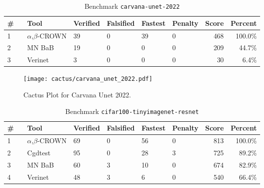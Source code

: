 

\begin{table}[h]
\begin{center}
\caption{Benchmark \texttt{carvana-unet-2022}} \label{tab:cat_{cat}}
{\setlength{\tabcolsep}{2pt}
\begin{tabular}[h]{@{}llllllrr@{}}
\toprule
\textbf{\# ~} & \textbf{Tool} & \textbf{Verified} & \textbf{Falsified} & \textbf{Fastest} & \textbf{Penalty} & \textbf{Score} & \textbf{Percent}\\
\midrule
1 & $\alpha$,$\beta$-CROWN & 39 & 0 & 39 & 0 & 468 & 100.0\% \\
2 & MN BaB & 19 & 0 & 0 & 0 & 209 & 44.7\% \\
3 & Verinet & 3 & 0 & 0 & 0 & 30 & 6.4\% \\
\bottomrule
\end{tabular}
}
\end{center}
\end{table}



\begin{figure}[h]
\centerline{\texttt{[image: cactus/carvana\_unet\_2022.pdf]}}
\caption{Cactus Plot for Carvana Unet 2022.}
\label{fig:quantPic}
\end{figure}



\begin{table}[h]
\begin{center}
\caption{Benchmark \texttt{cifar100-tinyimagenet-resnet}} \label{tab:cat_{cat}}
{\setlength{\tabcolsep}{2pt}
\begin{tabular}[h]{@{}llllllrr@{}}
\toprule
\textbf{\# ~} & \textbf{Tool} & \textbf{Verified} & \textbf{Falsified} & \textbf{Fastest} & \textbf{Penalty} & \textbf{Score} & \textbf{Percent}\\
\midrule
1 & $\alpha$,$\beta$-CROWN & 69 & 0 & 56 & 0 & 813 & 100.0\% \\
2 & Cgdtest & 95 & 0 & 28 & 3 & 725 & 89.2\% \\
3 & MN BaB & 60 & 3 & 10 & 0 & 674 & 82.9\% \\
4 & Verinet & 48 & 3 & 6 & 0 & 540 & 66.4\% \\
\bottomrule
\end{tabular}
}
\end{center}
\end{table}



